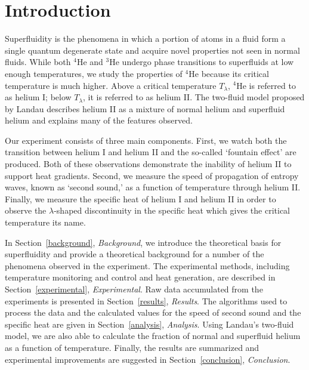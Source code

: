 
\section{Introduction}\label{introduction}

Superfluidity is the phenomena in which a portion of atoms in a fluid form a single quantum degenerate state and acquire novel properties not seen in normal fluids. While both $^{4}$He and $^{3}$He undergo phase transitions to superfluids at low enough temperatures, we study the properties of $^{4}$He because its critical temperature is much higher. Above a critical temperature $T_{\lambda}$, $^{4}$He is referred to as helium I; below $T_{\lambda}$, it is referred to as helium II. The two-fluid model proposed by Landau \cite{landau} describes helium II as a mixture of normal helium and superfluid helium and explains many of the features observed.

Our experiment consists of three main components. First, we watch both the transition between helium I and helium II and the so-called `fountain effect' are produced. Both of these observations demonstrate the inability of helium II to support heat gradients. Second, we measure the speed of propagation of entropy waves, known as `second sound,'  as a function of temperature through helium II. Finally, we measure the specific heat of helium I and helium II in order to observe the $\lambda$-shaped discontinuity in the specific heat which gives the critical temperature its name.

In Section~\ref{background}, \emph{Background}, we introduce the theoretical basis for superfluidity and provide a theoretical background for a number of the phenomena observed in the experiment. The experimental methods, including temperature monitoring and control and heat generation, are described in Section~\ref{experimental}, \emph{Experimental}. Raw data accumulated from the experiments is presented in Section~\ref{results}, \emph{Results}. The algorithms used to process the data and the calculated values for the speed of second sound and the specific heat are given in Section~\ref{analysis}, \emph{Analysis}. Using Landau's two-fluid model, we are also able to calculate the fraction of normal and superfluid helium as a function of temperature. Finally, the results are summarized and experimental improvements are suggested in Section~\ref{conclusion}, \emph{Conclusion}.